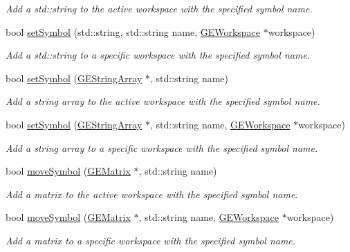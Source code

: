 \begin{DoxyCompactItemize}
\begin{DoxyCompactList}\small\item\em Add a std\-::string to the active workspace with the specified symbol name. \end{DoxyCompactList}\item 
bool \hyperlink{class_g_a_u_s_s_a7bf4d629d539c1cba827ec59220b4659}{set\-Symbol} (std\-::string, std\-::string name, \hyperlink{class_g_e_workspace}{G\-E\-Workspace} $\ast$workspace)
\begin{DoxyCompactList}\small\item\em Add a std\-::string to a specific workspace with the specified symbol name. \end{DoxyCompactList}\item 
bool \hyperlink{class_g_a_u_s_s_ac73f4a999e796eccb2728f1f914baff6}{set\-Symbol} (\hyperlink{class_g_e_string_array}{G\-E\-String\-Array} $\ast$, std\-::string name)
\begin{DoxyCompactList}\small\item\em Add a string array to the active workspace with the specified symbol name. \end{DoxyCompactList}\item 
bool \hyperlink{class_g_a_u_s_s_a608f4d41dbb4dd9fe839732bf5412043}{set\-Symbol} (\hyperlink{class_g_e_string_array}{G\-E\-String\-Array} $\ast$, std\-::string name, \hyperlink{class_g_e_workspace}{G\-E\-Workspace} $\ast$workspace)
\begin{DoxyCompactList}\small\item\em Add a string array to a specific workspace with the specified symbol name. \end{DoxyCompactList}\item 
bool \hyperlink{class_g_a_u_s_s_a6301062a26bd78f37893318e5618f6cb}{move\-Symbol} (\hyperlink{class_g_e_matrix}{G\-E\-Matrix} $\ast$, std\-::string name)
\begin{DoxyCompactList}\small\item\em Add a matrix to the active workspace with the specified symbol name. \end{DoxyCompactList}\item 
bool \hyperlink{class_g_a_u_s_s_ad2061e878f99b3536b1b832f421e2327}{move\-Symbol} (\hyperlink{class_g_e_matrix}{G\-E\-Matrix} $\ast$, std\-::string name, \hyperlink{class_g_e_workspace}{G\-E\-Workspace} $\ast$workspace)
\begin{DoxyCompactList}\small\item\em Add a matrix to a specific workspace with the specified symbol name. \end{DoxyCompactList}\item 

\end{DoxyCompactItemize}
